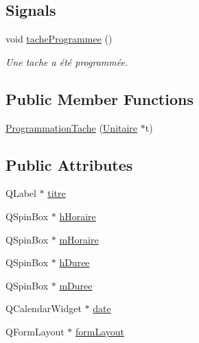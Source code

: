 \subsection*{Signals}
\begin{DoxyCompactItemize}
\item 
void \hyperlink{class_programmation_tache_a86deb26ff4326577af72514a09c6eb35}{tache\+Programmee} ()
\begin{DoxyCompactList}\small\item\em Une tache a été programmée. \end{DoxyCompactList}\end{DoxyCompactItemize}
\subsection*{Public Member Functions}
\begin{DoxyCompactItemize}
\item 
\hyperlink{class_programmation_tache_afea7e682b7e6065d906e7d1479d5ed3d}{Programmation\+Tache} (\hyperlink{class_unitaire}{Unitaire} $\ast$t)
\end{DoxyCompactItemize}
\subsection*{Public Attributes}
\begin{DoxyCompactItemize}
\item 
Q\+Label $\ast$ \hyperlink{class_programmation_tache_a6eea8febad907f0705eb3a9e8cc3fbde}{titre}
\item 
Q\+Spin\+Box $\ast$ \hyperlink{class_programmation_tache_a19daaa27a4939dd499b80f57ed84a1fe}{h\+Horaire}
\item 
Q\+Spin\+Box $\ast$ \hyperlink{class_programmation_tache_a2d966e73c014f058565681c5e75e4894}{m\+Horaire}
\item 
Q\+Spin\+Box $\ast$ \hyperlink{class_programmation_tache_afe61c430a658d980efa98c7438e69138}{h\+Duree}
\item 
Q\+Spin\+Box $\ast$ \hyperlink{class_programmation_tache_a0761dfd09ef37d029a8d38f2db32d69d}{m\+Duree}
\item 
Q\+Calendar\+Widget $\ast$ \hyperlink{class_programmation_tache_a65d7216f9e6aa7b663f67cdc38b6b2c2}{date}
\item 
Q\+Form\+Layout $\ast$ \hyperlink{class_programmation_tache_a9de086b288d85e80903c18a8200a1cae}{form\+Layout}
\end{DoxyCompactItemize}


